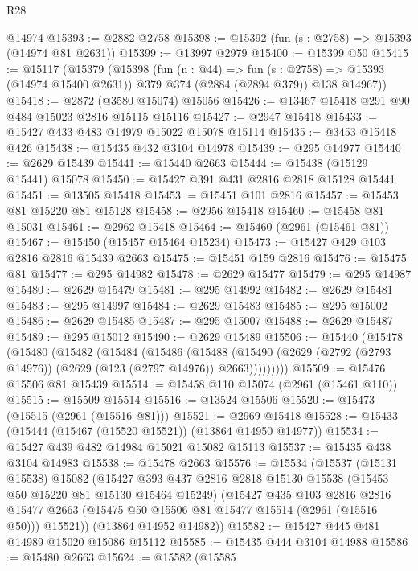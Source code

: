 \begin{lexlean}{R28}
\begin{coremodule}
    @14974
@15393 := @2882 @2758
@15398 := @15392 (fun (s : @2758) => @15393 (@14974 @81 @2631))
@15399 := @13997 @2979
@15400 := @15399 @50
@15415 := @15117
    (@15379
      (@15398
        (fun (n : @44) => fun (s : @2758) => @15393 (@14974 @15400 @2631))
        @379
        @374
        (@2884 (@2894 @379))
        @138
        @14967))
@15418 := @2872 (@3580 @15074) @15056
@15426 := @13467 @15418 @291 @90 @484 @15023 @2816 @15115 @15116
@15427 := @2947 @15418
@15433 := @15427 @433 @483 @14979 @15022 @15078 @15114
@15435 := @3453 @15418 @426
@15438 := @15435 @432 @3104 @14978
@15439 := @295 @14977
@15440 := @2629 @15439
@15441 := @15440 @2663
@15444 := @15438 (@15129 @15441) @15078
@15450 := @15427 @391 @431 @2816 @2818 @15128 @15441
@15451 := @13505 @15418
@15453 := @15451 @101 @2816
@15457 := @15453 @81 @15220 @81 @15128
@15458 := @2956 @15418
@15460 := @15458 @81 @15031
@15461 := @2962 @15418
@15464 := @15460 (@2961 (@15461 @81))
@15467 := @15450 (@15457 @15464 @15234)
@15473 := @15427 @429 @103 @2816 @2816 @15439 @2663
@15475 := @15451 @159 @2816
@15476 := @15475 @81
@15477 := @295 @14982
@15478 := @2629 @15477
@15479 := @295 @14987
@15480 := @2629 @15479
@15481 := @295 @14992
@15482 := @2629 @15481
@15483 := @295 @14997
@15484 := @2629 @15483
@15485 := @295 @15002
@15486 := @2629 @15485
@15487 := @295 @15007
@15488 := @2629 @15487
@15489 := @295 @15012
@15490 := @2629 @15489
@15506 := @15440
    (@15478
      (@15480
        (@15482
          (@15484
            (@15486
              (@15488
                (@15490 (@2629 (@2792 (@2793 @14976)) (@2629 (@123 (@2797 @14976)) @2663)))))))))
@15509 := @15476 @15506 @81 @15439
@15514 := @15458 @110 @15074 (@2961 (@15461 @110))
@15515 := @15509 @15514
@15516 := @13524 @15506
@15520 := @15473 (@15515 (@2961 (@15516 @81)))
@15521 := @2969 @15418
@15528 := @15433 (@15444 (@15467 (@15520 @15521)) (@13864 @14950 @14977))
@15534 := @15427 @439 @482 @14984 @15021 @15082 @15113
@15537 := @15435 @438 @3104 @14983
@15538 := @15478 @2663
@15576 := @15534
    (@15537
      (@15131 @15538)
      @15082
      (@15427
        @393
        @437
        @2816
        @2818
        @15130
        @15538
        (@15453 @50 @15220 @81 @15130 @15464 @15249)
        (@15427
          @435
          @103
          @2816
          @2816
          @15477
          @2663
          (@15475 @50 @15506 @81 @15477 @15514 (@2961 (@15516 @50)))
          @15521))
      (@13864 @14952 @14982))
@15582 := @15427 @445 @481 @14989 @15020 @15086 @15112
@15585 := @15435 @444 @3104 @14988
@15586 := @15480 @2663
@15624 := @15582
    (@15585

\end{coremodule}
\end{lexlean}
